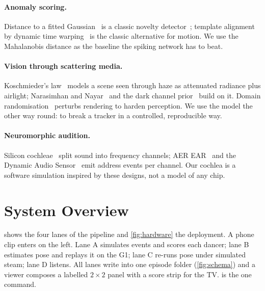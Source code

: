 \documentclass[10pt]{article}
\begin{document}
\paragraph{Anomaly scoring.} Distance to a fitted Gaussian~\cite{mahalanobis1936} is a classic novelty detector~\cite{chandola2009anomaly}; template alignment by dynamic time warping~\cite{sakoe1978dtw} is the classic alternative for motion. We use the Mahalanobis distance as the baseline the spiking network has to beat.

\paragraph{Vision through scattering media.} Koschmieder's law~\cite{koschmieder1924} models a scene seen through haze as attenuated radiance plus airlight; Narasimhan and Nayar~\cite{narasimhan2002vision} and the dark channel prior~\cite{he2009dark} build on it. Domain randomisation~\cite{tobin2017domain} perturbs rendering to harden perception. We use the model the other way round: to break a tracker in a controlled, reproducible way.

\paragraph{Neuromorphic audition.} Silicon cochleae~\cite{lyon1988cochlea} split sound into frequency channels; AER EAR~\cite{chan2007aerear} and the Dynamic Audio Sensor~\cite{liu2014das} emit address events per channel. Our cochlea is a software simulation inspired by these designs, not a model of any chip.

\section{System Overview}
\label{sec:overview}

 shows the four lanes of the pipeline and \cref{fig:hardware} the deployment. A phone clip enters on the left. Lane A simulates events and scores each dancer; lane B estimates pose and replays it on the G1; lane C re-runs pose under simulated steam; lane D listens. All lanes write into one episode folder (\cref{fig:schema}) and a viewer composes a labelled $2{\times}2$ panel with a score strip for the TV.  is the one command.
\end{document}
